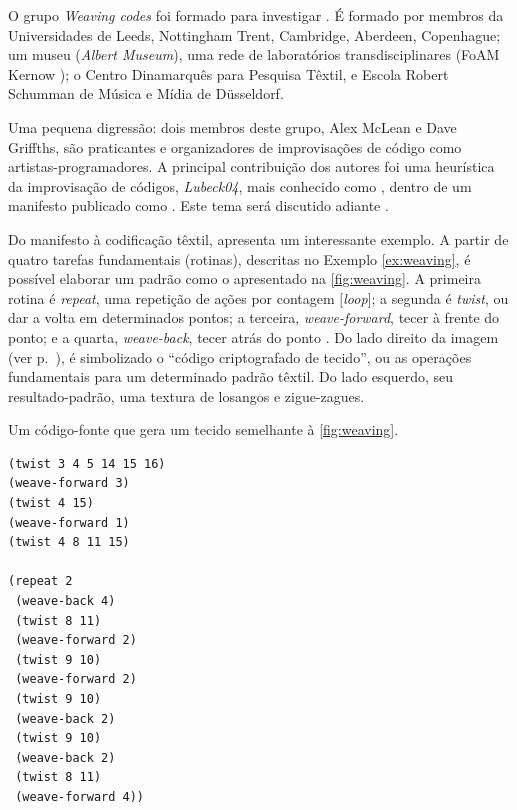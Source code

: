 O grupo \emph{Weaving codes} foi formado para  investigar . É formado por membros da Universidades de Leeds, Nottingham Trent, Cambridge, Aberdeen, Copenhague; um museu (\emph{Albert Museum}), uma rede de laboratórios transdisciplinares (FoAM Kernow ); o Centro Dinamarquês para Pesquisa Têxtil, e Escola Robert Schumman de Música e Mídia de  Düsseldorf. 

Uma pequena digressão: dois membros deste grupo, Alex McLean e Dave Griffths, são praticantes e organizadores de improvisações de código como artistas-programadores. A principal contribuição dos autores foi uma heurística da improvisação de códigos, \emph{Lubeck04}, mais conhecido como , dentro de um manifesto publicado como  \cite{ward_live_2004}. Este tema será discutido adiante .

Do manifesto à codificação têxtil,  apresenta um interessante exemplo. A partir de quatro tarefas fundamentais (rotinas), descritas no Exemplo \autoref{ex:weaving}, é possível elaborar um padrão como o apresentado na \autoref{fig:weaving}. A primeira rotina é \emph{repeat}, uma repetição de ações por contagem $[$\emph{loop}$]$; a segunda é \emph{twist}, ou dar a volta em determinados pontos; a terceira,  \emph{weave-forward}, tecer à frente do ponto; e a quarta, \emph{weave-back}, tecer atrás do ponto . Do lado direito da imagem (ver p.~\pageref{fig:weaving}), é simbolizado o ``código criptografado de tecido'', ou as operações fundamentais para um determinado padrão têxtil. Do lado esquerdo, seu resultado-padrão, uma textura de losangos e zigue-zagues.  

\begin{example}{Um código-fonte que gera um tecido semelhante à \autoref{fig:weaving}.}
\label{ex:weaving}

\begin{verbatim}
(twist 3 4 5 14 15 16)
(weave-forward 3)
(twist 4 15)
(weave-forward 1)
(twist 4 8 11 15)

(repeat 2
 (weave-back 4)
 (twist 8 11)
 (weave-forward 2)
 (twist 9 10)
 (weave-forward 2)
 (twist 9 10)
 (weave-back 2)
 (twist 9 10)
 (weave-back 2)
 (twist 8 11)
 (weave-forward 4))
\end{verbatim}
\end{example}

